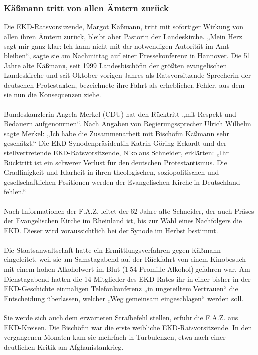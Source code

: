 \documentclass[a4paper,12pt,twoside]{scrbook}
\begin{document}
\subsubsection{Käßmann tritt von allen Ämtern zurück}
Die EKD-Ratsvorsitzende, Margot Käßmann, tritt mit sofortiger Wirkung von allen ihren Ämtern zurück, bleibt aber Pastorin der Landeskirche. „Mein Herz sagt mir ganz klar: Ich kann nicht mit der notwendigen Autorität im Amt bleiben“, sagte sie am Nachmittag auf einer Pressekonferenz in Hannover. Die 51 Jahre alte Käßmann, seit 1999 Landesbischöfin der größten evangelischen Landeskirche und seit Oktober vorigen Jahres als Ratsvorsitzende Sprecherin der deutschen Protestanten, bezeichnete ihre Fahrt als erheblichen Fehler, aus dem sie nun die Konsequenzen ziehe.
\\\\
Bundeskanzlerin Angela Merkel (CDU) hat den Rücktritt „mit Respekt und Bedauern aufgenommen“. Nach Angaben von Regierungssprecher Ulrich Wilhelm sagte Merkel: „Ich habe die Zusammenarbeit mit Bischöfin Käßmann sehr geschätzt.“ Die EKD-Synodenpräsidentin Katrin Göring-Eckardt und der stellvertretende EKD-Ratsvorsitzende, Nikolaus Schneider, erklärten: „Ihr Rücktritt ist ein schwerer Verlust für den deutschen Protestantismus. Die Gradlinigkeit und Klarheit in ihren theologischen, soziopolitischen und gesellschaftlichen Positionen werden der Evangelischen Kirche in Deutschland fehlen.“
\\\\
Nach Informationen der F.A.Z. leitet der 62 Jahre alte Schneider, der auch Präses der Evangelischen Kirche im Rheinland ist, bis zur Wahl eines Nachfolgers die EKD. Dieser wird voraussichtlich bei der Synode im Herbst bestimmt.
\\\\
Die Staatsanwaltschaft hatte ein Ermittlungsverfahren gegen Käßmann eingeleitet, weil sie am Samstagabend auf der Rückfahrt von einem Kinobesuch mit einem hohen Alkoholwert im Blut (1,54 Promille Alkohol) gefahren war. Am Dienstagabend hatten die 14 Mitglieder des EKD-Rates ihr in einer bisher in der EKD-Geschichte einmaligen Telefonkonferenz „in ungeteiltem Vertrauen“ die Entscheidung überlassen, welcher „Weg gemeinsam eingeschlagen“ werden soll.
\\\\
Sie werde sich auch dem erwarteten Strafbefehl stellen, erfuhr die F.A.Z. aus EKD-Kreisen. Die Bischöfin war die erste weibliche EKD-Ratsvorsitzende. In den vergangenen Monaten kam sie mehrfach in Turbulenzen, etwa nach einer deutlichen Kritik am Afghanistankrieg.
\end{document}
